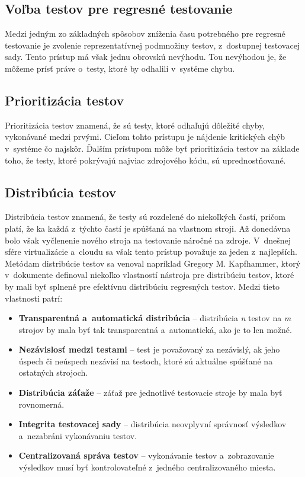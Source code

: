 \subsection*{Voľba testov pre regresné testovanie}
Medzi jedným zo základných spôsobov zníženia času potrebného pre 
regresné testovanie je zvolenie reprezentatívnej podmnožiny testov,
z~dostupnej testovacej sady. Tento prístup má však jednu obrovskú nevýhodu. 
Tou nevýhodou je, že môžeme prísť práve o~testy, ktoré by odhalili 
v~systéme chybu. 

\subsection*{Prioritizácia testov}
Prioritizácia testov znamená, že sú testy, ktoré odhaľujú dôležité chyby, 
vykonávané medzi prvými. Cieľom tohto prístupu je nájdenie kritických 
chýb v~systéme čo najskôr. Ďalším prístupom môže byť prioritizácia testov 
na základe toho, že testy, ktoré pokrývajú najviac zdrojového kódu,
sú uprednostňované.

\subsection*{Distribúcia testov}
Distribúcia testov znamená, že testy sú rozdelené do niekoľkých častí,
pričom platí, že ka každá z~týchto častí je spúšťaná na vlastnom stroji.
Až donedávna bolo však vyčlenenie nového stroja na testovanie náročné 
na zdroje. V~dnešnej sfére virtualizácie a~cloudu sa však tento prístup 
považuje za jeden z~najlepších. 
Metódam distribúcie testov sa venoval napríklad Gregory M. Kapfhammer, 
ktorý v~dokumente \cite{Kapfhammer} definoval niekoľko vlastností nástroja 
pre distribúciu testov, ktoré by mali byť splnené pre efektívnu 
distribúciu regresných testov. Medzi tieto vlastnosti patrí:
\begin{itemize}
\item \textbf{Transparentná a~automatická distribúcia} -- distribúcia 
\emph{n} testov na \emph{m} strojov by mala byť tak transparentná 
a~automatická, ako je to len možné.
\item \textbf{Nezávislosť medzi testami} -- test je považovaný za 
nezávislý, ak jeho úspech či neúspech nezávisí na testoch, ktoré sú 
aktuálne spúšťané na ostatných strojoch. 
\item \textbf{Distribúcia záťaže} -- záťaž pre jednotlivé testovacie 
stroje by mala byť rovnomerná.
\item \textbf{Integrita testovacej sady} -- distribúcia neovplyvní 
správnosť výsledkov a~nezabráni vykonávaniu testov.
\item \textbf{Centralizovaná správa testov} -- vykonávanie testov 
a~zobrazovanie výsledkov musí byť kontrolovateľné z~jedného 
centralizovaného miesta.
\end{itemize}




